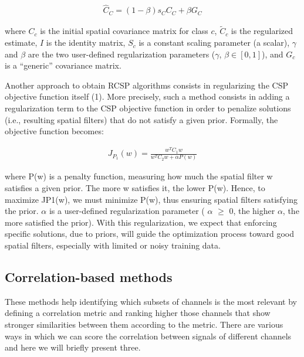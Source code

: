 \documentclass{Configuration_Files/PoliMi3i_thesis}
\begin{document}
\begin{align}
	\hat{C}_{C} = (1 - \beta) {s}_{C} {C}_{C} + \beta {G}_{C}
	\label{eq:RCSP2}
\end{align}


where $C_{c}$ is the initial spatial covariance matrix for class $c$, $\tilde{C}_{c}$ is the regularized estimate, $I$ is the identity matrix, $S_{c}$ is a constant scaling parameter (a scalar), $\gamma$ and $\beta$ are the two user-defined regularization parameters ($\gamma$, $\beta \in [0,1]$), and $G_{c}$ is a “generic” covariance matrix. \cite{lotteRegularizingCommonSpatial2011}

Another approach to obtain RCSP algorithms consists in regularizing the CSP objective function itself (1). More precisely, such a method consists in adding a regularization term to the CSP objective function in order to penalize solutions (i.e., resulting spatial filters) that do not satisfy a given prior. Formally, the objective function becomes:

\begin{align}
	{J}_{P_{1}}(w) = \frac{w^{T}C_{1}w}{w^{T}C_{2}w + \alpha P(w)}
	\label{eq:RCSP3}
\end{align}

where P(w) is a penalty function, measuring how much the spatial filter w satisfies a given prior. The more w satisfies it, the lower P(w). Hence, to maximize JP1(w), we must minimize P(w), thus ensuring spatial filters satisfying the prior. $\alpha$ is a user-defined regularization parameter ( $\alpha$ $\geq$  0, the higher $\alpha$, the more satisfied the prior). With this regularization, we expect that enforcing specific solutions, due to priors, will guide the optimization process toward good spatial filters, especially with limited or noisy training data. \cite{lotteRegularizingCommonSpatial2011}


\subsection{Correlation-based methods}

These methods help identifying which subsets of channels is the most relevant by defining a correlation metric and ranking higher those channels that show stronger similarities between them according to the metric.
There are various ways in which we can score the correlation between signals of different channels and here we will briefly present three.
\end{document}
